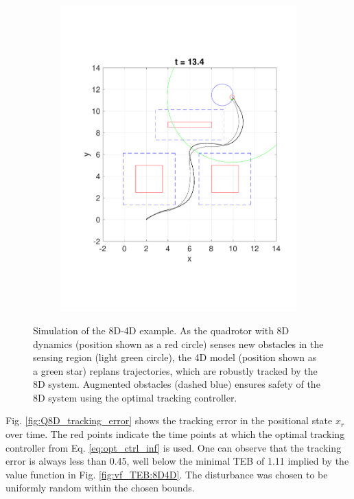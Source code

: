 \begin{figure}
\begin{subfigure}[t]{0.49\columnwidth}
    \includegraphics[width=\columnwidth]{fig/Q8D_Q4D/134}
  \end{subfigure}
  \caption{Simulation of the 8D-4D example. As the quadrotor with 8D dynamics (position shown as a red circle) senses new obstacles in the sensing region (light green circle), the 4D model (position shown as a green star) replans trajectories, which are robustly tracked by the 8D system. Augmented obstacles (dashed blue) ensures safety of the 8D system using the optimal tracking controller.} \label{fig:8D4Dsim}
\end{figure}

Fig. \ref{fig:Q8D_tracking_error} shows the tracking error in the positional state $x_r$ over time. The red points indicate the time points at which the optimal tracking controller from Eq. \eqref{eq:opt_ctrl_inf} is used. One can observe that the tracking error is always less than 0.45, well below the minimal TEB of 1.11 implied by the value function in Fig. \ref{fig:vf_TEB:8D4D}.
The disturbance was chosen to be uniformly random within the chosen bounds.

